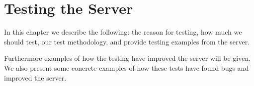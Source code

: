 \chapter{Testing the Server}\label{cha:testing}
In this chapter we describe the following: the reason for testing, how much we should test, our test methodology, and provide testing examples from the server.

Furthermore examples of how the testing have improved the server will be given.
We also present some concrete examples of how these tests have found bugs and improved the server.

